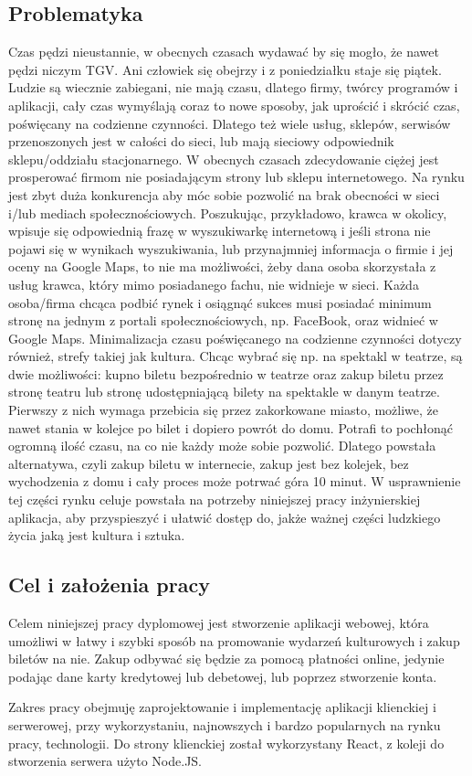 \documentclass[12pt]{article}
\begin{document}
\begin{sloppypar}
{  \subsection{Problematyka}
  {
    Czas pędzi nieustannie, w obecnych czasach wydawać by się mogło, że nawet pędzi niczym TGV. Ani człowiek się obejrzy i z poniedziałku staje się piątek. 
    Ludzie są wiecznie zabiegani, nie mają czasu, dlatego firmy, twórcy programów i aplikacji, cały czas wymyślają coraz to nowe sposoby, jak uprościć i 
    skrócić czas, poświęcany na codzienne czynności.
    Dlatego też wiele usług, sklepów, serwisów przenoszonych jest w całości do sieci, lub mają sieciowy odpowiednik sklepu/oddziału stacjonarnego. 
    W obecnych czasach zdecydowanie ciężej jest prosperować firmom nie posiadającym strony lub sklepu internetowego. 
    Na rynku jest zbyt duża konkurencja aby móc sobie pozwolić na brak obecności w sieci i/lub mediach społecznościowych. 
    Poszukując, przykładowo, krawca w okolicy, wpisuje się odpowiednią frazę w wyszukiwarkę internetową i jeśli strona nie pojawi się w wynikach wyszukiwania, lub 
    przynajmniej informacja o firmie i jej oceny na Google Maps, to nie ma możliwości, 
    żeby dana osoba skorzystała z usług krawca, który mimo posiadanego fachu, nie widnieje w sieci. 
    Każda osoba/firma chcąca podbić rynek i osiągnąć sukces musi posiadać minimum stronę na jednym z portali społecznościowych, np. FaceBook, oraz widnieć w Google Maps. 
    Minimalizacja czasu poświęcanego na codzienne czynności dotyczy również, strefy takiej jak kultura. 
    Chcąc wybrać się np. na spektakl w teatrze, są dwie możliwości: kupno biletu bezpośrednio w teatrze oraz zakup biletu przez stronę teatru lub stronę udostępniającą bilety na spektakle w danym teatrze.
    Pierwszy z nich wymaga przebicia się przez zakorkowane miasto, możliwe, że nawet stania w kolejce po bilet i dopiero powrót do domu. 
    Potrafi to pochłonąć ogromną ilość czasu, na co nie każdy może sobie pozwolić. 
    Dlatego powstała alternatywa, czyli zakup biletu w internecie, zakup jest bez kolejek, bez wychodzenia z domu i cały proces może potrwać góra 10 minut. 
    W usprawnienie tej części rynku celuje powstała na potrzeby niniejszej pracy inżynierskiej aplikacja, aby przyspieszyć i ułatwić dostęp do, jakże ważnej części ludzkiego życia jaką jest kultura i sztuka. 
  }
  \subsection{Cel i założenia pracy}
  {
    Celem niniejszej pracy dyplomowej jest stworzenie aplikacji webowej, która umożliwi w łatwy i szybki
    sposób na promowanie wydarzeń kulturowych i zakup biletów na nie. Zakup odbywać się będzie za pomocą
    płatności online, jedynie podając dane karty kredytowej lub debetowej, lub poprzez stworzenie konta.\par
    Zakres pracy obejmuję zaprojektowanie i implementację aplikacji klienckiej i serwerowej, przy
    wykorzystaniu, najnowszych i bardzo popularnych na rynku pracy, technologii. Do strony klienckiej
    został wykorzystany React, z koleji do stworzenia serwera użyto Node.JS.
  }
}
\end{sloppypar}
\end{document}

